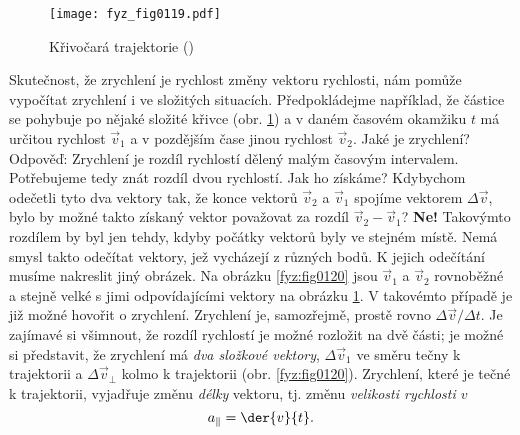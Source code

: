     \begin{figure}[ht!]  %
      \centering
      \texttt{[image: fyz\_fig0119.pdf]}
      \caption{Křivočará trajektorie (\cite[s.~163]{Feynman01})}
      \label{fyz:fig0119}
    \end{figure}
    Skutečnost, že zrychlení je rychlost změny vektoru rychlosti, nám pomůže vypočítat zrychlení i 
    ve složitých situacích. Předpokládejme například, že částice se pohybuje po nějaké složité 
    křivce (obr. \ref{fyz:fig0119}) a v daném časovém okamžiku \(t\) má určitou rychlost 
    \(\vec{v}_1\) a v pozdějším čase jinou rychlost \(\vec{v}_2\). Jaké je zrychlení? Odpověď: 
    Zrychlení je rozdíl rychlostí dělený malým časovým intervalem. Potřebujeme tedy znát rozdíl 
    dvou rychlostí. Jak ho získáme? Kdybychom odečetli tyto dva vektory tak, že konce vektorů 
    \(\vec{v}_2\) a \(\vec{v}_1\) spojíme vektorem \(\Delta \vec{v}\), bylo by možné takto získaný 
    vektor považovat za rozdíl \(\vec{v}_2 - \vec{v}_1\)? \textbf{Ne!} Takovýmto rozdílem by byl 
    jen tehdy, kdyby počátky vektorů byly ve stejném místě. Nemá smysl takto odečítat vektory, jež 
    vycházejí z různých bodů. K jejich odečítání musíme nakreslit jiný obrázek. Na obrázku 
    \ref{fyz:fig0120} jsou \(\vec{v}_1\) a \(\vec{v}_2\) rovnoběžné a stejně velké s jimi 
    odpovídajícími vektory na obrázku \ref{fyz:fig0119}. V takovémto případě je již možné hovořit o 
    zrychlení. Zrychlení je, samozřejmě, prostě rovno \(\Delta\vec{v}/\Delta t\). Je zajímavé si 
    všimnout, že rozdíl rychlostí je možné rozložit na dvě části; je možné si představit, že 
    zrychlení má \emph{dva složkové vektory}, \(\Delta\vec{v}_1\) ve směru tečny k trajektorii a 
    \(\Delta\vec{v}_\perp\) kolmo k trajektorii (obr. \ref{fyz:fig0120}). Zrychlení, které je tečné 
    k trajektorii, vyjadřuje změnu \emph{délky} vektoru, tj. změnu \emph{velikosti rychlosti \(v\)}
    \begin{equation}\label{fyz:eq153}
      a_\parallel = \der{v}{t}.
    \end{equation}


